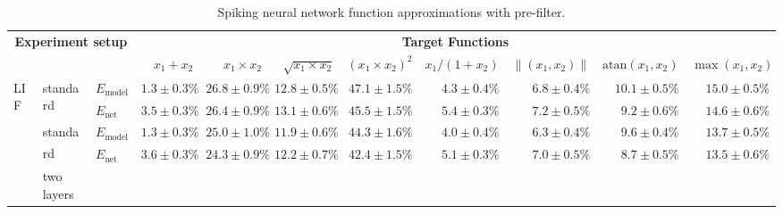 \begin{sidewaystable}
	\caption[Spiking neural network function approximations with pre-filter]{Spiking neural network function approximations with pre-filter.}
	\label{tbl:function_approximations_pre_filter}
	\centering
	\sffamily
	\scriptsize
	\begin{tabular}{p{2.2cm} p{1.7cm} l r r r r r r r r }
	\toprule
	\multicolumn{3}{c}{\textbf{Experiment setup}} & \multicolumn{8}{c}{{\textbf{Target Functions}}}\\
	\cmidrule(r){1-3}\cmidrule{4-11}
	& & & $x_1 + x_2$ & $x_1 \times x_2$ & $\sqrt{x_1 \times x_2}$ & $(x_1 \times x_2) ^ 2$ & $x_1 / (1 + x_2)$ & $\|(x_1, x_2)\|$ & $\mathrm{atan}(x_1, x_2)$ & $\max(x_1, x_2)$\\
	\midrule
	\multirow{8}{2.2cm}{\raggedleft %
	LIF} &
	\multirow{2}{1.7cm}{\raggedleft standard} &
	$E_\mathrm{model}$ & 
	\color{Gray}$1.3 \pm 0.3\%$ & \color{Gray}$26.8 \pm 0.9\%$ & \color{Gray}$12.8 \pm 0.5\%$ & \color{Gray}$47.1 \pm 1.5\%$ & \color{Gray}$4.3 \pm 0.4\%$ & \color{Gray}$6.8 \pm 0.4\%$ & \color{Gray}$10.1 \pm 0.5\%$ & \color{Gray}$15.0 \pm 0.5\%$
	\\
	& & 
	$E_\mathrm{net}$ &
	\cellcolor{White!63!SteelBlue}$3.5 \pm 0.3\%$ & \cellcolor{White!7!SteelBlue}$26.4 \pm 0.9\%$ & \cellcolor{White!7!SteelBlue}$13.1 \pm 0.6\%$ & \cellcolor{White!7!SteelBlue}$45.5 \pm 1.5\%$ & \cellcolor{White!57!SteelBlue}$5.4 \pm 0.3\%$ & \cellcolor{White!32!SteelBlue}$7.2 \pm 0.5\%$ & \cellcolor{White!32!SteelBlue}$9.2 \pm 0.6\%$ & \cellcolor{White!19!SteelBlue}$14.6 \pm 0.6\%$
	\\\cmidrule(l){2-11}
	&
	\multirow{2}{1.7cm}{\raggedleft standard\textsuperscript{\dag}} &
	$E_\mathrm{model}$ & 
	\color{Gray}$1.3 \pm 0.3\%$ & \color{Gray}$25.0 \pm 1.0\%$ & \color{Gray}$11.9 \pm 0.6\%$ & \color{Gray}$44.3 \pm 1.6\%$ & \color{Gray}$4.0 \pm 0.4\%$ & \color{Gray}$6.3 \pm 0.4\%$ & \color{Gray}$9.6 \pm 0.4\%$ & \color{Gray}$13.7 \pm 0.5\%$
	\\
	& & 
	$E_\mathrm{net}$ &
	\cellcolor{White!57!SteelBlue}$3.6 \pm 0.3\%$ & \cellcolor{White!13!SteelBlue}$24.3 \pm 0.9\%$ & \cellcolor{White!13!SteelBlue}$12.2 \pm 0.7\%$ & \cellcolor{White!13!SteelBlue}$42.4 \pm 1.5\%$ & \cellcolor{White!63!SteelBlue}$5.1 \pm 0.3\%$ & \cellcolor{White!50!SteelBlue}$7.0 \pm 0.5\%$ & \cellcolor{White!38!SteelBlue}$8.7 \pm 0.5\%$ & \cellcolor{White!25!SteelBlue}$13.5 \pm 0.6\%$
	\\\cmidrule(l){2-11}
	&
	\multirow{2}{1.7cm}{\raggedleft two layers} &

\end{tabular}
\end{sidewaystable}
